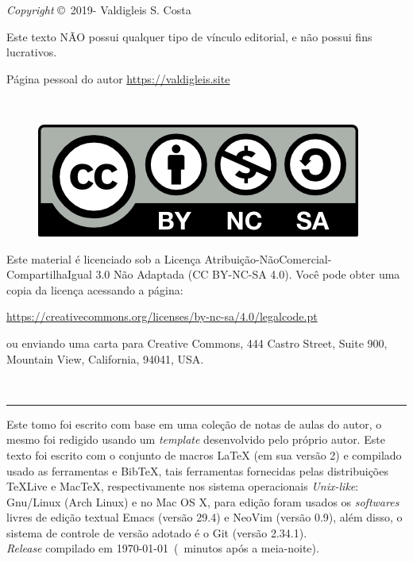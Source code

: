 \begingroup

\newpage
\thispagestyle{empty}





\noindent \textit{Copyright} \copyright\ 2019-{\the\year} Valdigleis S. Costa

\noindent Este texto  \textsc{NÃO}  possui qualquer tipo de vínculo editorial, e não possui fins lucrativos.

\noindent Página pessoal do autor \url{https://valdigleis.site}

~\vfill

\thispagestyle{empty}

\begin{figure}[h]
	\centering
	\includegraphics[width=0.15\linewidth]{fig/license}
\end{figure}
\noindent Este material é licenciado sob a Licença Atribuição-NãoComercial-CompartilhaIgual 3.0 Não Adaptada (CC BY-NC-SA 4.0).  Você pode obter uma copia da licença acessando a página: 
\begin{center}
	\url{https://creativecommons.org/licenses/by-nc-sa/4.0/legalcode.pt}
\end{center}
\noindent ou enviando uma carta para Creative Commons, 444 Castro Street, Suite 900, Mountain View, California, 94041, USA.

~\vfill

\hrule
\vspace*{1cm}

\noindent Este tomo foi escrito com base em uma coleção de notas de aulas do autor, o mesmo foi redigido usando um \textit{template} desenvolvido pelo próprio autor. Este texto foi escrito com o conjunto de macros {\LaTeX} ({\color{NordAurora1}em sua versão 2}) e compilado usado as ferramentas {\LuaLaTeX} e {Bib\TeX}, tais ferramentas fornecidas pelas distribuições {\TeX}Live e Mac{\TeX}, respectivamente  nos sistema operacionais \textit{Unix-like}: Gnu/Linux ({\color{NordAurora1}Arch Linux}) e no Mac OS X, para edição foram usados os \textit{softwares} livres  de edição textual Emacs ({\color{NordAurora1}versão 29.4}) e NeoVim ({\color{NordAurora1}versão 0.9}), além disso, o sistema de controle de versão adotado é o Git ({\color{NordAurora1}versão 2.34.1}). \\ 

\noindent \textit{Release} compilado em \today\ (\MinutesAfterMidnight\ minutos após a meia-noite). %

\endgroup
